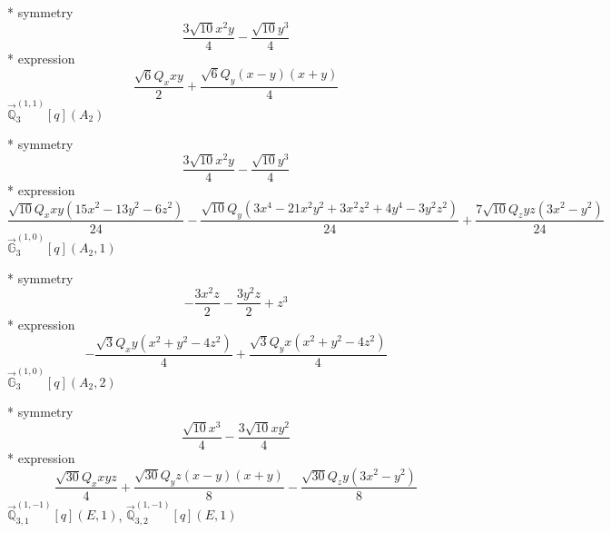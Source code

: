 \documentclass[fleqn,8pt]{jsarticle}
\begin{document}
\noindent\quad ** symmetry
\begin{dmath*}
\frac{3 \sqrt{10} x^{2} y}{4} - \frac{\sqrt{10} y^{3}}{4}
\end{dmath*}
\noindent\quad ** expression
\begin{dmath*}
\frac{\sqrt{6} Q_{x} x y}{2} + \frac{\sqrt{6} Q_{y} \left(x - y\right) \left(x + y\right)}{4}
\end{dmath*}
\noindent\quad $\vec{\mathbb{Q}}_{3}^{(1,1)}[q](A_{2})$

\noindent\quad ** symmetry
\begin{dmath*}
\frac{3 \sqrt{10} x^{2} y}{4} - \frac{\sqrt{10} y^{3}}{4}
\end{dmath*}
\noindent\quad ** expression
\begin{dmath*}
\frac{\sqrt{10} Q_{x} x y \left(15 x^{2} - 13 y^{2} - 6 z^{2}\right)}{24} - \frac{\sqrt{10} Q_{y} \left(3 x^{4} - 21 x^{2} y^{2} + 3 x^{2} z^{2} + 4 y^{4} - 3 y^{2} z^{2}\right)}{24} + \frac{7 \sqrt{10} Q_{z} y z \left(3 x^{2} - y^{2}\right)}{24}
\end{dmath*}
\noindent\quad $\vec{\mathbb{G}}_{3}^{(1,0)}[q](A_{2},1)$

\noindent\quad ** symmetry
\begin{dmath*}
- \frac{3 x^{2} z}{2} - \frac{3 y^{2} z}{2} + z^{3}
\end{dmath*}
\noindent\quad ** expression
\begin{dmath*}
- \frac{\sqrt{3} Q_{x} y \left(x^{2} + y^{2} - 4 z^{2}\right)}{4} + \frac{\sqrt{3} Q_{y} x \left(x^{2} + y^{2} - 4 z^{2}\right)}{4}
\end{dmath*}
\noindent\quad $\vec{\mathbb{G}}_{3}^{(1,0)}[q](A_{2},2)$

\noindent\quad ** symmetry
\begin{dmath*}
\frac{\sqrt{10} x^{3}}{4} - \frac{3 \sqrt{10} x y^{2}}{4}
\end{dmath*}
\noindent\quad ** expression
\begin{dmath*}
\frac{\sqrt{30} Q_{x} x y z}{4} + \frac{\sqrt{30} Q_{y} z \left(x - y\right) \left(x + y\right)}{8} - \frac{\sqrt{30} Q_{z} y \left(3 x^{2} - y^{2}\right)}{8}
\end{dmath*}
\noindent\quad $\vec{\mathbb{Q}}_{3,1}^{(1,-1)}[q](E,1)$, $\vec{\mathbb{Q}}_{3,2}^{(1,-1)}[q](E,1)$
\end{document}

